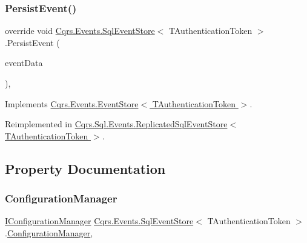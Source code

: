 \mbox{\label{classCqrs_1_1Events_1_1SqlEventStore_a8d67570d50a97050cbce5a29d7a4b9f6}} 
\subsubsection{\texorpdfstring{Persist\+Event()}{PersistEvent()}}
{\footnotesize\ttfamily override void \hyperlink{classCqrs_1_1Events_1_1SqlEventStore}{Cqrs.\+Events.\+Sql\+Event\+Store}$<$ T\+Authentication\+Token $>$.Persist\+Event (\begin{DoxyParamCaption}\item[{\hyperlink{classCqrs_1_1Events_1_1EventData}{Event\+Data}}]{event\+Data }\end{DoxyParamCaption})\hspace{0.3cm}{\ttfamily [protected]}, {\ttfamily [virtual]}}



Implements \hyperlink{classCqrs_1_1Events_1_1EventStore_aedb71ca0ddf21220e323bc60ad7508cd}{Cqrs.\+Events.\+Event\+Store$<$ T\+Authentication\+Token $>$}.



Reimplemented in \hyperlink{classCqrs_1_1Sql_1_1Events_1_1ReplicatedSqlEventStore_a51c9b1329327e456a251aa2d910fc7ae}{Cqrs.\+Sql.\+Events.\+Replicated\+Sql\+Event\+Store$<$ T\+Authentication\+Token $>$}.



\subsection{Property Documentation}
\mbox{\label{classCqrs_1_1Events_1_1SqlEventStore_ac74de2a6905b38d167bcb23055e19b3d}} 
\subsubsection{\texorpdfstring{Configuration\+Manager}{ConfigurationManager}}
{\footnotesize\ttfamily \hyperlink{interfaceCqrs_1_1Configuration_1_1IConfigurationManager}{I\+Configuration\+Manager} \hyperlink{classCqrs_1_1Events_1_1SqlEventStore}{Cqrs.\+Events.\+Sql\+Event\+Store}$<$ T\+Authentication\+Token $>$.\hyperlink{classCqrs_1_1Configuration_1_1ConfigurationManager}{Configuration\+Manager}\hspace{0.3cm}{\ttfamily [get]}, {\ttfamily [protected]}}


